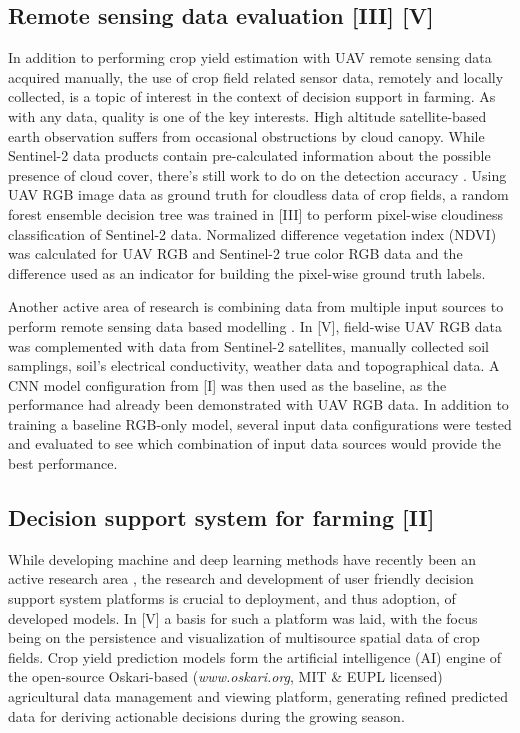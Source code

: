\subsection*{Remote sensing data evaluation [III] [V]}

In addition to performing crop yield estimation with UAV remote sensing data acquired manually, the use of crop field related sensor data, remotely and locally collected, is a topic of interest in the context of decision support in farming. As with any data, quality is one of the key interests. High altitude satellite-based earth observation suffers from occasional obstructions by cloud canopy. While Sentinel-2 data products contain pre-calculated information about the possible presence of cloud cover, there's still work to do on the detection accuracy \cite{Coluzzi2018}. Using UAV RGB image data as ground truth for cloudless data of crop fields, a random forest ensemble decision tree was trained in [III] to perform pixel-wise cloudiness classification of Sentinel-2 data. Normalized difference vegetation index (NDVI) was calculated for UAV RGB and Sentinel-2 true color RGB data and the difference used as an indicator for building the pixel-wise ground truth labels.

Another active area of research is combining data from multiple input sources to perform remote sensing data based modelling \cite{Ghamisi2019}. In [V], field-wise UAV RGB data was complemented with data from Sentinel-2 satellites, manually collected soil samplings, soil's electrical conductivity, weather data and topographical data. A CNN model configuration from [I] was then used as the baseline, as the performance had already been demonstrated with UAV RGB data. In addition to training a baseline RGB-only model, several input data configurations were tested and evaluated to see which combination of input data sources would provide the best performance.

\subsection*{Decision support system for farming [II]}

While developing machine and deep learning methods have recently been an active research area \cite{VanKlompenburg2020}, the research and development of user friendly decision support system platforms is crucial to deployment, and thus adoption, of developed models. In [V] a basis for such a platform was laid, with the focus being on the persistence and visualization of multisource spatial data of crop fields. Crop yield prediction models form the artificial intelligence (AI) engine of the open-source Oskari-based (\emph{www.oskari.org}, MIT \& EUPL licensed) agricultural data management and viewing platform, generating refined predicted data for deriving actionable decisions during the growing season.
